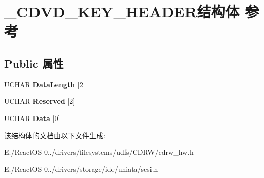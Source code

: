 \hypertarget{struct___c_d_v_d___k_e_y___h_e_a_d_e_r}{}\section{\+\_\+\+C\+D\+V\+D\+\_\+\+K\+E\+Y\+\_\+\+H\+E\+A\+D\+E\+R结构体 参考}
\label{struct___c_d_v_d___k_e_y___h_e_a_d_e_r}
\subsection*{Public 属性}
\begin{DoxyCompactItemize}
\item 
\mbox{\label{struct___c_d_v_d___k_e_y___h_e_a_d_e_r_afb8a6eeb1d5467f2b53e4af93addcc61}} 
U\+C\+H\+AR {\bfseries Data\+Length} \mbox{[}2\mbox{]}
\item 
\mbox{\label{struct___c_d_v_d___k_e_y___h_e_a_d_e_r_a3a4f5ca39739f1f6cba3386a1a7f9a17}} 
U\+C\+H\+AR {\bfseries Reserved} \mbox{[}2\mbox{]}
\item 
\mbox{\label{struct___c_d_v_d___k_e_y___h_e_a_d_e_r_aed68a141395032933110c89e82b0e799}} 
U\+C\+H\+AR {\bfseries Data} \mbox{[}0\mbox{]}
\end{DoxyCompactItemize}


该结构体的文档由以下文件生成\+:\begin{DoxyCompactItemize}
\item 
E\+:/\+React\+O\+S-\/0../drivers/filesystems/udfs/\+C\+D\+R\+W/cdrw\+\_\+hw.\+h\item 
E\+:/\+React\+O\+S-\/0../drivers/storage/ide/uniata/scsi.\+h\end{DoxyCompactItemize}
